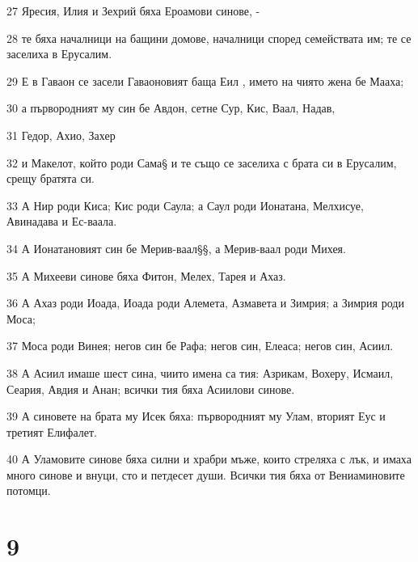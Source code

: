 \par 27 Яресия, Илия и Зехрий бяха Ероамови синове, -
\par 28 те бяха началници на бащини домове, началници според семействата им; те се заселиха в Ерусалим.
\par 29 Е в Гаваон се засели Гаваоновият баща Еил , името на чиято жена бе Мааха;
\par 30 а първородният му син бе Авдон, сетне Сур, Кис, Ваал, Надав,
\par 31 Гедор, Ахио, Захер
\par 32 и Макелот, който роди Сама§ и те също се заселиха с брата си в Ерусалим, срещу братята си.
\par 33 А Нир роди Киса; Кис роди Саула; а Саул роди Ионатана, Мелхисуе, Авинадава и Ес-ваала.
\par 34 А Ионатановият син бе Мерив-ваал§§, а Мерив-ваал роди Михея.
\par 35 А Михееви синове бяха Фитон, Мелех, Тарея и Ахаз.
\par 36 А Ахаз роди Иоада, Иоада роди Алемета, Азмавета и Зимрия; а Зимрия роди Моса;
\par 37 Моса роди Винея; негов син бе Рафа; негов син, Елеаса; негов син, Асиил.
\par 38 А Асиил имаше шест сина, чиито имена са тия: Азрикам, Вохеру, Исмаил, Сеария, Авдия и Анан; всички тия бяха Асиилови синове.
\par 39 А синовете на брата му Исек бяха: първородният му Улам, вторият Еус и третият Елифалет.
\par 40 А Уламовите синове бяха силни и храбри мъже, които стреляха с лък, и имаха много синове и внуци, сто и петдесет души. Всички тия бяха от Вениаминовите потомци.

\chapter{9}

